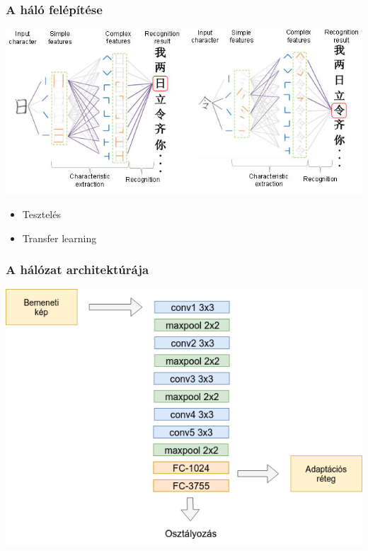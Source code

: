 \documentclass{beamer}
\begin{document}
\begin{frame}[fragile]
\frametitle{A háló felépítése}

\includegraphics[scale=0.485]{CNN_CCR_working}

\begin{itemize}
\item Tesztelés
\item Transfer learning
\end{itemize}

\end{frame}

\begin{frame}[fragile]
\frametitle{A hálózat architektúrája}

\includegraphics[scale=0.5]{architecture}

\end{frame}
\end{document}
